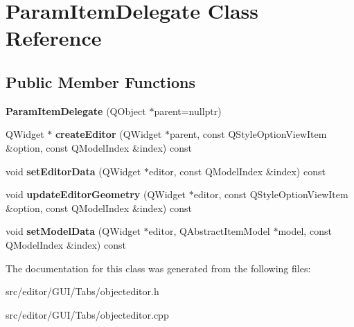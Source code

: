 \hypertarget{class_param_item_delegate}{\section{\-Param\-Item\-Delegate \-Class \-Reference}
\label{class_param_item_delegate}
}
\subsection*{\-Public \-Member \-Functions}
\begin{DoxyCompactItemize}
\item 
\hypertarget{class_param_item_delegate_a6acb9a6811ec974fc85697e56ceaec41}{{\bfseries \-Param\-Item\-Delegate} (\-Q\-Object $\ast$parent=nullptr)}\label{class_param_item_delegate_a6acb9a6811ec974fc85697e56ceaec41}

\item 
\hypertarget{class_param_item_delegate_a68e901c9ac85ccc1cbaca2b64fe69f10}{\-Q\-Widget $\ast$ {\bfseries create\-Editor} (\-Q\-Widget $\ast$parent, const \-Q\-Style\-Option\-View\-Item \&option, const \-Q\-Model\-Index \&index) const }\label{class_param_item_delegate_a68e901c9ac85ccc1cbaca2b64fe69f10}

\item 
\hypertarget{class_param_item_delegate_a798243552904b05a3cfbb466ed787ee0}{void {\bfseries set\-Editor\-Data} (\-Q\-Widget $\ast$editor, const \-Q\-Model\-Index \&index) const }\label{class_param_item_delegate_a798243552904b05a3cfbb466ed787ee0}

\item 
\hypertarget{class_param_item_delegate_a242c364371adb8f5bc44feeb6aced31f}{void {\bfseries update\-Editor\-Geometry} (\-Q\-Widget $\ast$editor, const \-Q\-Style\-Option\-View\-Item \&option, const \-Q\-Model\-Index \&index) const }\label{class_param_item_delegate_a242c364371adb8f5bc44feeb6aced31f}

\item 
\hypertarget{class_param_item_delegate_aab30c96a59e7166c2039626745aebefa}{void {\bfseries set\-Model\-Data} (\-Q\-Widget $\ast$editor, \-Q\-Abstract\-Item\-Model $\ast$model, const \-Q\-Model\-Index \&index) const }\label{class_param_item_delegate_aab30c96a59e7166c2039626745aebefa}

\end{DoxyCompactItemize}


\-The documentation for this class was generated from the following files\-:\begin{DoxyCompactItemize}
\item 
src/editor/\-G\-U\-I/\-Tabs/objecteditor.\-h\item 
src/editor/\-G\-U\-I/\-Tabs/objecteditor.\-cpp\end{DoxyCompactItemize}
